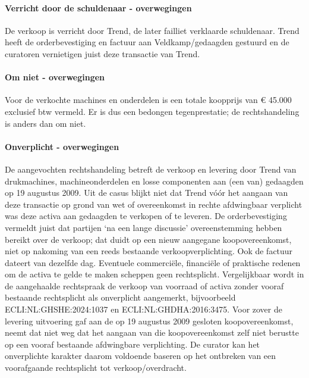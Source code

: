 \documentclass[
  dutch,
  a4paper,
]{article}
\begin{document}
\paragraph{Verricht door de schuldenaar - overwegingen}\label{verricht-door-de-schuldenaar---overwegingen-67}

De verkoop is verricht door Trend, de later failliet verklaarde schuldenaar. Trend heeft de orderbevestiging en factuur aan Veldkamp/gedaagden gestuurd en de curatoren vernietigen juist deze transactie van Trend.

\paragraph{Om niet - overwegingen}\label{om-niet---overwegingen-67}

Voor de verkochte machines en onderdelen is een totale koopprijs van € 45.000 exclusief btw vermeld. Er is dus een bedongen tegenprestatie; de rechtshandeling is anders dan om niet.

\paragraph{Onverplicht - overwegingen}\label{onverplicht---overwegingen-67}

De aangevochten rechtshandeling betreft de verkoop en levering door Trend van drukmachines, machineonderdelen en losse componenten aan (een van) gedaagden op 19 augustus 2009. Uit de casus blijkt niet dat Trend vóór het aangaan van deze transactie op grond van wet of overeenkomst in rechte afdwingbaar verplicht was deze activa aan gedaagden te verkopen of te leveren. De orderbevestiging vermeldt juist dat partijen `na een lange discussie' overeenstemming hebben bereikt over de verkoop; dat duidt op een nieuw aangegane koopovereenkomst, niet op nakoming van een reeds bestaande verkoopverplichting. Ook de factuur dateert van dezelfde dag. Eventuele commerciële, financiële of praktische redenen om de activa te gelde te maken scheppen geen rechtsplicht. Vergelijkbaar wordt in de aangehaalde rechtspraak de verkoop van voorraad of activa zonder vooraf bestaande rechtsplicht als onverplicht aangemerkt, bijvoorbeeld ECLI:NL:GHSHE:2024:1037 en ECLI:NL:GHDHA:2016:3475. Voor zover de levering uitvoering gaf aan de op 19 augustus 2009 gesloten koopovereenkomst, neemt dat niet weg dat het aangaan van die koopovereenkomst zelf niet berustte op een vooraf bestaande afdwingbare verplichting. De curator kan het onverplichte karakter daarom voldoende baseren op het ontbreken van een voorafgaande rechtsplicht tot verkoop/overdracht.
\end{document}
